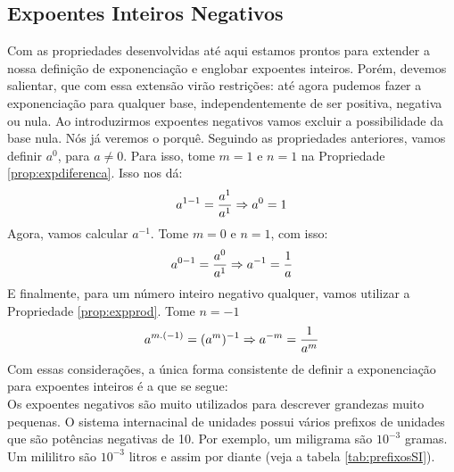 \subsection{Expoentes Inteiros Negativos}
Com as propriedades desenvolvidas até aqui estamos prontos para extender a nossa definição de exponenciação e englobar expoentes inteiros. Porém, devemos salientar, que com essa extensão virão restrições: até agora pudemos fazer a exponenciação para qualquer base, independentemente de ser positiva, negativa ou nula. Ao introduzirmos expoentes negativos vamos excluir a possibilidade da base nula. Nós já veremos o porquê.
Seguindo as propriedades anteriores, vamos definir $a^0$, para $a\ne0$. Para isso, tome $m=1$ e $n=1$ na Propriedade \ref{prop:expdiferenca}. Isso nos dá:$$a^{1-1}=\frac{a^1}{a^1} \Rightarrow a^0=1$$Agora, vamos calcular $a^{-1}$. Tome $m=0$ e $n=1$, com isso:$$a^{0-1}=\frac{a^0}{a^1} \Rightarrow a^{-1}=\frac{1}{a}$$E finalmente, para um número inteiro negativo qualquer, vamos utilizar a Propriedade \ref{prop:expprod}. Tome $n=-1$ $$a^{m.(-1)} = (a^m)^{-1} \Rightarrow a^{-m} = \frac{1}{a^m}$$Com essas considerações, a única forma consistente de definir a exponenciação para expoentes inteiros é a que se segue:
\\
Os expoentes negativos são muito utilizados para descrever grandezas muito pequenas. O sistema internacinal de unidades possui vários prefixos de unidades que são potências negativas de 10. Por exemplo, um miligrama são $10^{-3}$ gramas. Um mililitro são $10^{-3}$ litros e assim por diante (veja a tabela \ref{tab:prefixosSI}).
\newpage
\comecaexer
